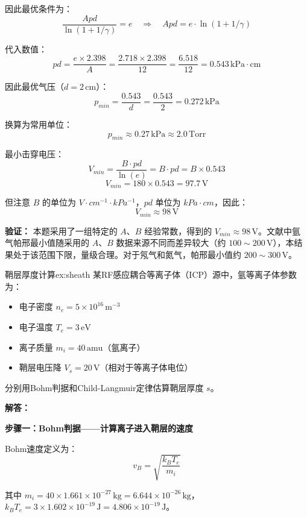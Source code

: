 因此最优条件为：
\[
    \frac{A p d}{\ln(1+1/\gamma)} = e \quad\Rightarrow\quad A p d = e \cdot \ln(1+1/\gamma)
\]

代入数值：
\[
    p d = \frac{e \times 2.398}{A} = \frac{2.718 \times 2.398}{12} = \frac{6.518}{12} = 0.543\,\mathrm{kPa\cdot cm}
\]

因此最优气压（$d=2\,\mathrm{cm}$）：
\[
    p_{min} = \frac{0.543}{d} = \frac{0.543}{2} = 0.272\,\mathrm{kPa}
\]

换算为常用单位：
\[
    \boxed{p_{min} \approx 0.27\,\mathrm{kPa} \approx 2.0\,\mathrm{Torr}}
\]

最小击穿电压：
\[
    V_{min} = \frac{B \cdot p d}{\ln(e)} = B \cdot p d = B \times 0.543
\]
\[
    V_{min} = 180 \times 0.543 = 97.7\,\mathrm{V}
\]

但注意 $B$ 的单位为 $V\cdot cm^{-1}\cdot kPa^{-1}$，$p d$ 单位为 $kPa\cdot cm$，因此：
\[
    \boxed{V_{min} \approx 98\,\mathrm{V}}
\]

\textbf{验证：} 本题采用了一组特定的 $A$、$B$ 经验常数，得到的 $V_{min}\approx 98\,\mathrm{V}$。文献中氩气帕邢最小值随采用的 $A$、$B$ 数据来源不同而差异较大（约 $100\sim200\,\mathrm{V}$），本结果处于该范围下限，量级合理。对于氖气和氮气，帕邢最小值约 $200\sim300\,\mathrm{V}$。


\begin{example}{鞘层厚度计算}{ex:sheath}
某RF感应耦合等离子体（ICP）源中，氩等离子体参数为：
\begin{itemize}
    \item 电子密度 $n_e = 5\times10^{16}\,\mathrm{m^{-3}}$
    \item 电子温度 $T_e = 3\,\mathrm{eV}$
    \item 离子质量 $m_i = 40\,\mathrm{amu}$（氩离子）
    \item 鞘层电压降 $V_s = 20\,\mathrm{V}$（相对于等离子体电位）
\end{itemize}
分别用Bohm判据和Child-Langmuir定律估算鞘层厚度 $s$。
\end{example}

\textbf{解答：}

\textbf{步骤一：Bohm判据——计算离子进入鞘层的速度}

Bohm速度定义为：
\begin{equation}
    v_B = \sqrt{\frac{k_B T_e}{m_i}}
\label{eq:ch11-bohm-criterion-ex}
\end{equation}

其中 $m_i = 40 \times 1.661\times10^{-27}\,\mathrm{kg} = 6.644\times10^{-26}\,\mathrm{kg}$，$k_B T_e = 3 \times 1.602\times10^{-19}\,\mathrm{J} = 4.806\times10^{-19}\,\mathrm{J}$。

